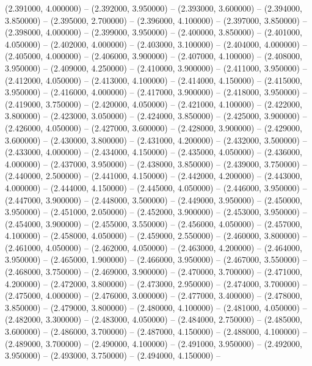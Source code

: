 (2.391000, 4.000000) -- 
(2.392000, 3.950000) -- 
(2.393000, 3.600000) -- 
(2.394000, 3.850000) -- 
(2.395000, 2.700000) -- 
(2.396000, 4.100000) -- 
(2.397000, 3.850000) -- 
(2.398000, 4.000000) -- 
(2.399000, 3.950000) -- 
(2.400000, 3.850000) -- 
(2.401000, 4.050000) -- 
(2.402000, 4.000000) -- 
(2.403000, 3.100000) -- 
(2.404000, 4.000000) -- 
(2.405000, 4.000000) -- 
(2.406000, 3.900000) -- 
(2.407000, 4.100000) -- 
(2.408000, 3.950000) -- 
(2.409000, 4.250000) -- 
(2.410000, 3.900000) -- 
(2.411000, 3.950000) -- 
(2.412000, 4.050000) -- 
(2.413000, 4.100000) -- 
(2.414000, 4.150000) -- 
(2.415000, 3.950000) -- 
(2.416000, 4.000000) -- 
(2.417000, 3.900000) -- 
(2.418000, 3.950000) -- 
(2.419000, 3.750000) -- 
(2.420000, 4.050000) -- 
(2.421000, 4.100000) -- 
(2.422000, 3.800000) -- 
(2.423000, 3.050000) -- 
(2.424000, 3.850000) -- 
(2.425000, 3.900000) -- 
(2.426000, 4.050000) -- 
(2.427000, 3.600000) -- 
(2.428000, 3.900000) -- 
(2.429000, 3.600000) -- 
(2.430000, 3.800000) -- 
(2.431000, 4.200000) -- 
(2.432000, 3.500000) -- 
(2.433000, 4.000000) -- 
(2.434000, 4.150000) -- 
(2.435000, 4.050000) -- 
(2.436000, 4.000000) -- 
(2.437000, 3.950000) -- 
(2.438000, 3.850000) -- 
(2.439000, 3.750000) -- 
(2.440000, 2.500000) -- 
(2.441000, 4.150000) -- 
(2.442000, 4.200000) -- 
(2.443000, 4.000000) -- 
(2.444000, 4.150000) -- 
(2.445000, 4.050000) -- 
(2.446000, 3.950000) -- 
(2.447000, 3.900000) -- 
(2.448000, 3.500000) -- 
(2.449000, 3.950000) -- 
(2.450000, 3.950000) -- 
(2.451000, 2.050000) -- 
(2.452000, 3.900000) -- 
(2.453000, 3.950000) -- 
(2.454000, 3.900000) -- 
(2.455000, 3.550000) -- 
(2.456000, 4.050000) -- 
(2.457000, 4.100000) -- 
(2.458000, 4.050000) -- 
(2.459000, 2.550000) -- 
(2.460000, 3.800000) -- 
(2.461000, 4.050000) -- 
(2.462000, 4.050000) -- 
(2.463000, 4.200000) -- 
(2.464000, 3.950000) -- 
(2.465000, 1.900000) -- 
(2.466000, 3.950000) -- 
(2.467000, 3.550000) -- 
(2.468000, 3.750000) -- 
(2.469000, 3.900000) -- 
(2.470000, 3.700000) -- 
(2.471000, 4.200000) -- 
(2.472000, 3.800000) -- 
(2.473000, 2.950000) -- 
(2.474000, 3.700000) -- 
(2.475000, 4.000000) -- 
(2.476000, 3.000000) -- 
(2.477000, 3.400000) -- 
(2.478000, 3.850000) -- 
(2.479000, 3.800000) -- 
(2.480000, 4.100000) -- 
(2.481000, 4.050000) -- 
(2.482000, 3.300000) -- 
(2.483000, 4.050000) -- 
(2.484000, 2.750000) -- 
(2.485000, 3.600000) -- 
(2.486000, 3.700000) -- 
(2.487000, 4.150000) -- 
(2.488000, 4.100000) -- 
(2.489000, 3.700000) -- 
(2.490000, 4.100000) -- 
(2.491000, 3.950000) -- 
(2.492000, 3.950000) -- 
(2.493000, 3.750000) -- 
(2.494000, 4.150000) -- 

